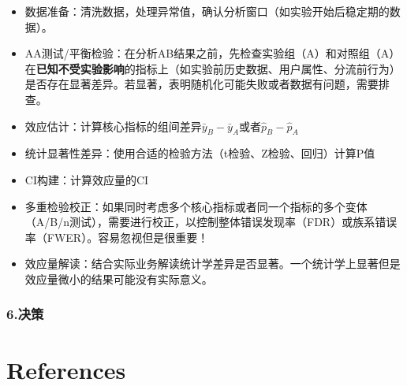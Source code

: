 \documentclass[
  letterpaper,
  DIV=11,
  numbers=noendperiod]{scrreprt}
\begin{document}
\begin{itemize}
\item
  数据准备：清洗数据，处理异常值，确认分析窗口（如实验开始后稳定期的数据）。
\item
  AA测试/平衡检验：在分析AB结果之前，先检查实验组（A）和对照组（A）在\textbf{已知不受实验影响}的指标上（如实验前历史数据、用户属性、分流前行为）是否存在显著差异。若显著，表明随机化可能失败或者数据有问题，需要排查。
\item
  效应估计：计算核心指标的组间差异\(\bar{y}_B-\bar{y}_A\)或者\(\hat{p}_B-\hat{p}_A\)
\item
  统计显著性差异：使用合适的检验方法（t检验、Z检验、回归）计算P值
\item
  CI构建：计算效应量的CI
\item
  多重检验校正：如果同时考虑多个核心指标或者同一个指标的多个变体（A/B/n测试），需要进行校正，以控制整体错误发现率（FDR）或族系错误率（FWER）。容易忽视但是很重要！
\item
  效应量解读：结合实际业务解读统计学差异是否显著。一个统计学上显著但是效应量微小的结果可能没有实际意义。
\end{itemize}

\subsection{6.决策}\label{ux51b3ux7b56}


\chapter*{References}\label{references}


\label{refs}
\end{document}
